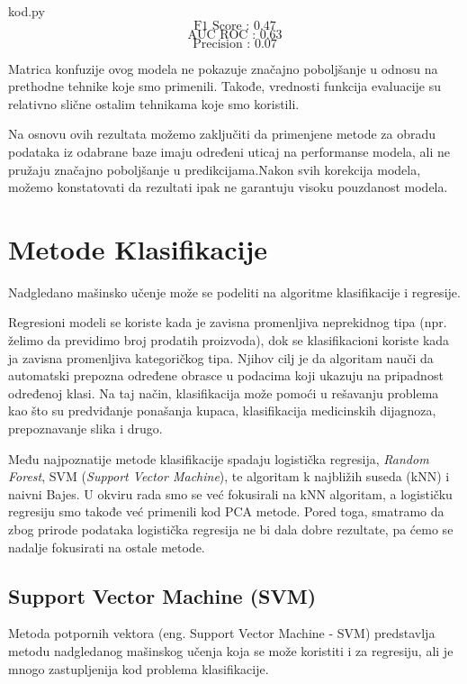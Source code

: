 \documentclass[12pt]{article}
\theoremstyle{definition}
\theoremstyle{remark}
\begin{document}
\hfill

{kod.py}
$$
\text{F1 Score : 0.47}
$$
$$
\text{AUC ROC : 0.63}
$$
$$
\text{Precision : 0.07}
$$
\hfill

Matrica konfuzije ovog modela ne pokazuje značajno poboljšanje u odnosu na prethodne tehnike koje smo primenili. Takođe, vrednosti funkcija evaluacije su relativno slične ostalim tehnikama koje smo koristili.

Na osnovu ovih rezultata možemo zaključiti da primenjene metode za obradu podataka iz odabrane baze imaju određeni uticaj na performanse modela, ali ne pružaju značajno poboljšanje u predikcijama.Nakon svih korekcija modela, možemo konstatovati da rezultati ipak ne garantuju visoku pouzdanost modela.

\newpage
\section{Metode Klasifikacije}

Nadgledano mašinsko učenje može se podeliti na algoritme klasifikacije i regresije. 

Regresioni modeli se koriste kada je zavisna promenljiva neprekidnog tipa (npr. želimo da previdimo broj prodatih proizvoda), dok se klasifikacioni koriste kada ja zavisna promenljiva kategoričkog tipa. Njihov cilj je da algoritam nauči da automatski prepozna određene obrasce u podacima koji ukazuju na pripadnost određenoj klasi. Na taj način, klasifikacija može pomoći u rešavanju problema kao što su predviđanje ponašanja kupaca, klasifikacija medicinskih dijagnoza, prepoznavanje slika i drugo.

Među najpoznatije metode klasifikacije spadaju logistička regresija, \emph{Random Forest}, SVM (\emph{Support Vector Machine}), te algoritam k najbližih suseda (kNN) i naivni Bajes. U okviru rada smo se već fokusirali na kNN algoritam, a logističku regresiju smo takođe već primenili kod PCA metode. Pored toga, smatramo da zbog prirode podataka logistička regresija ne bi dala dobre rezultate, pa ćemo se nadalje fokusirati na ostale metode.

\subsection{Support Vector Machine (SVM)} 

Metoda potpornih vektora (eng. Support Vector Machine - SVM) predstavlja metodu nadgledanog mašinskog učenja koja se može koristiti i za regresiju, ali je mnogo zastupljenija kod problema klasifikacije. 
\end{document}
